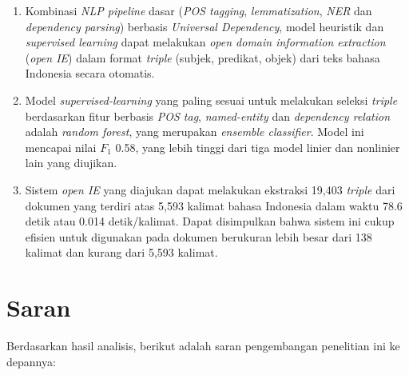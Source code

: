 \begin{enumerate}
	\item Kombinasi \textit{NLP pipeline} dasar (\textit{POS tagging}, \textit{lemmatization}, \textit{NER} dan \textit{dependency parsing}) berbasis \textit{Universal Dependency}, model heuristik dan \textit{supervised learning} dapat melakukan \textit{open domain information extraction} (\textit{open IE}) dalam format \textit{triple} (subjek, predikat, objek) dari teks bahasa Indonesia secara otomatis.
	
	\item Model \textit{supervised-learning} yang paling sesuai untuk melakukan seleksi \textit{triple} berdasarkan fitur berbasis \textit{POS tag}, \textit{named-entity} dan \textit{dependency relation} adalah \textit{random forest}, yang merupakan \textit{ensemble classifier}. Model ini mencapai nilai $F_1$ 0.58, yang lebih tinggi dari tiga model linier dan nonlinier lain yang diujikan.
	
	\item Sistem \textit{open IE} yang diajukan dapat melakukan ekstraksi 19,403 \textit{triple} dari dokumen yang terdiri atas 5,593 kalimat bahasa Indonesia dalam waktu 78.6 detik atau 0.014 detik/kalimat. Dapat disimpulkan bahwa sistem ini cukup efisien untuk digunakan pada dokumen berukuran lebih besar dari 138 kalimat dan kurang dari 5,593 kalimat.
\end{enumerate}


\section{Saran}


Berdasarkan hasil analisis, berikut adalah saran pengembangan penelitian ini ke depannya:

